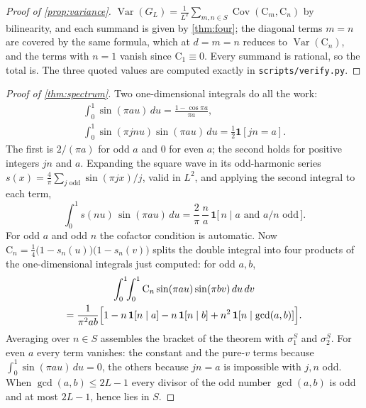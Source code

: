 \documentclass[11pt]{amsart}
\theoremstyle{definition}
\theoremstyle{remark}
\begin{document}
\begin{proof}[Proof of \cref{prop:variance}]
$\operatorname{Var}(G_L)=\frac1{L^2}\sum_{m,n\in S}\operatorname{Cov}(\mathrm{C}_m,\mathrm{C}_n)$ by bilinearity, and each summand is given by \cref{thm:four}; the diagonal terms $m=n$ are covered by the same formula, which at $d=m=n$ reduces to $\operatorname{Var}(\mathrm{C}_n)$, and the terms with $n=1$ vanish since $\mathrm{C}_1\equiv0$. Every summand is rational, so the total is. The three quoted values are computed exactly in \texttt{scripts/verify.py}.
\end{proof}

\begin{proof}[Proof of \cref{thm:spectrum}]
Two one-dimensional integrals do all the work:
\begin{gather*}
\int_0^1 \sin(\pi a u)\, du = \frac{1 - \cos \pi a}{\pi a},\\
\int_0^1 \sin(\pi j n u)\sin(\pi a u)\, du = \tfrac12 \mathbf 1[jn = a].
\end{gather*}
The first is $2/(\pi a)$ for odd $a$ and $0$ for even $a$; the second holds for positive integers $jn$ and $a$. Expanding the square wave in its odd-harmonic series $s(x) = \frac4\pi \sum_{j \text{ odd}} \sin(\pi j x)/j$, valid in $L^2$, and applying the second integral to each term,
\[
\int_0^1 s(nu)\,\sin(\pi a u)\, du = \frac{2}{\pi}\,\frac{n}{a}\,\mathbf 1\bigl[\,n \mid a \text{ and } a/n \text{ odd}\,\bigr].
\]
For odd $a$ and odd $n$ the cofactor condition is automatic. Now $\mathrm{C}_n = \tfrac14\bigl(1 - s_n(u)\bigr)\bigl(1 - s_n(v)\bigr)$ splits the double integral into four products of the one-dimensional integrals just computed: for odd $a, b$,
\begin{multline*}
\int_0^1\!\!\int_0^1 \mathrm{C}_n \sin(\pi a u)\sin(\pi b v)\, du\, dv \\
= \frac{1}{\pi^2 ab}\Bigl[ 1 - n\,\mathbf 1[n \mid a] - n\,\mathbf 1[n \mid b] + n^2\,\mathbf 1[n \mid \gcd(a,b)] \Bigr].
\end{multline*}
Averaging over $n \in S$ assembles the bracket of the theorem with $\sigma_1^S$ and $\sigma_2^S$. For even $a$ every term vanishes: the constant and the pure-$v$ terms because $\int_0^1 \sin(\pi a u)\, du = 0$, the others because $jn = a$ is impossible with $j, n$ odd. When $\gcd(a,b) \le 2L-1$ every divisor of the odd number $\gcd(a,b)$ is odd and at most $2L-1$, hence lies in $S$.
\end{proof}
\end{document}
